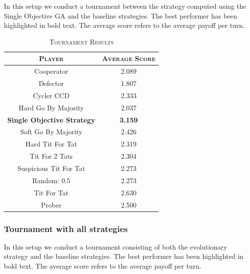 \documentclass[a4paper]{article}
\begin{document}
In this setup we conduct a tournament between the strategy computed using the Single Objective GA and the baseline strategies. The best performer has been highlighted in bold text. The average score refers to the average payoff per turn.
	
	\begin{table}[H]
	  \begin{center}
	    \begin{tabular}{c|c}
	      \toprule
	      \textsc{Player} & \textsc{Average Score}\\
	      \midrule
			Cooperator & 2.089\\
			Defector & 1.807\\
			Cycler CCD & 2.333\\
			Hard Go By Majority & 2.037\\
			\textbf{Single Objective Strategy} & \textbf{3.159}\\
			Soft Go By Majority & 2.426\\
			Hard Tit For Tat & 2.319\\
			Tit For 2 Tats & 2.304\\
			Suspicious Tit For Tat & 2.273\\
			Random: 0.5 & 2.273\\
			Tit For Tat & 2.630\\
			Prober & 2.500\\
		  \bottomrule
	    \end{tabular}
	    \caption{\textsc{Tournament Results}}
	  \end{center}
	\end{table}  

	\subsubsection{Tournament with all strategies}
	
In this setup we conduct a tournament consisting of both the evolutionary strategy and the baseline strategies. The best performer has been highlighted in bold text. The average score refers to the average payoff per turn.	
	
\end{document}
